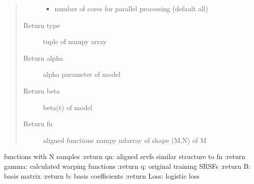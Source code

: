 \documentclass[letterpaper,10pt,english]{sphinxmanual}
\begin{document}
\begin{fulllineitems}
\begin{quote}
\begin{description}
\begin{itemize}
\item {} 
 \textendash{} number of cores for parallel processing (default all)

\end{itemize}

\item[{Return type}] \leavevmode
tuple of numpy array

\item[{Return alpha}] \leavevmode
alpha parameter of model

\item[{Return beta}] \leavevmode
beta(t) of model

\item[{Return fn}] \leavevmode
aligned functions \sphinxhyphen{} numpy ndarray of shape (M,N) of M

\end{description}\end{quote}

functions with N samples
:return qn: aligned srvfs \sphinxhyphen{} similar structure to fn
:return gamma: calculated warping functions
:return q: original training SRSFs
:return B: basis matrix
:return b: basis coefficients
:return Loss: logistic loss

\end{fulllineitems}

\end{document}

